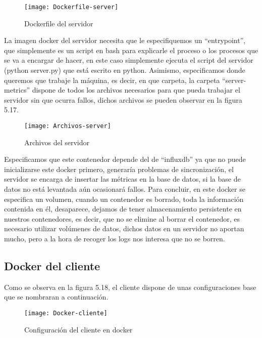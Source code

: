 \documentclass[ spanish, a4paper, 12pt, oneside]{report}
\begin{document}
\begin{figure}[!h]
   \centering
   \texttt{[image: Dockerfile-server]}\\
      \caption{\label{fig: Dockerfile del servidor} Dockerfile del servidor}
\end{figure}

La imagen docker del servidor necesita que le especifiquemos un ``entrypoint'', que simplemente es un script en bash para explicarle el proceso o los procesos que se va a encargar de hacer, en este caso simplemente ejecuta el script del servidor (python server.py) que está 
escrito en python. Asimismo, especificamos donde queremos que trabaje la máquina, es decir, en que carpeta, la carpeta ``server-metrics'' dispone de todos los archivos necesarios para que pueda trabajar el servidor sin que ocurra fallos, dichos archivos se pueden observar en la figura 5.17.\\

\begin{figure}[!h]
   \centering
   \texttt{[image: Archivos-server]}\\
      \caption{\label{fig: Archivos del servidor} Archivos del servidor}
\end{figure}

Especificamos que este contenedor depende del de ``influxdb'' ya que no puede inicializarse este docker primero, generaría problemas de sincronización, el servidor se encarga de insertar las métricas en la base de datos, si la base de datos no está levantada aún ocasionará fallos. 
Para concluir, en este docker se especifica un volumen, cuando un contenedor es borrado, toda la información contenida en él, desaparece, dejamos de tener almacenamiento persistente en nuestros contenedores, es decir, que no se elimine al borrar el contenedor, es necesario utilizar volúmenes de datos, 
dichos datos en un servidor no aportan mucho, pero a la hora de recoger los logs nos interesa que no se borren.\\

\subsection{Docker del cliente}
Como se observa en la figura 5.18, el cliente dispone de unas configuraciones base que se nombraran a continuación.\\

\begin{figure}[!h]
   \centering
   \texttt{[image: Docker-cliente]}\\
      \caption{\label{fig: Configuración del cliente en docker} Configuración del cliente en docker}
\end{figure}
\end{document}
